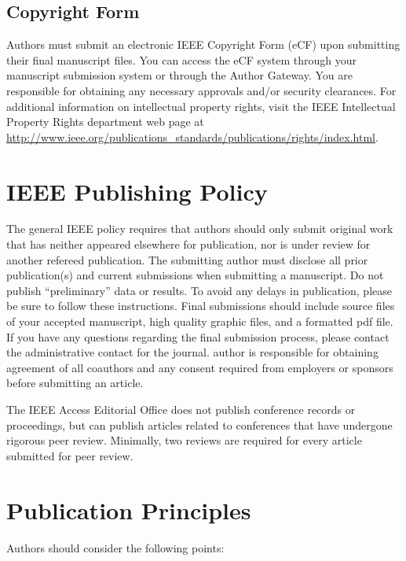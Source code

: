 \documentclass{ieeeaccess}
\begin{document}
\subsection{Copyright Form}
Authors must submit an electronic IEEE Copyright Form (eCF) upon submitting
their final manuscript files. You can access the eCF system through your
manuscript submission system or through the Author Gateway. You are
responsible for obtaining any necessary approvals and/or security
clearances. For additional information on intellectual property rights,
visit the IEEE Intellectual Property Rights department web page at
\underline{http://www.ieee.org/publications\_standards/publications/}\break\underline{rights/index.html}.

\section{\break IEEE Publishing Policy}
The general IEEE policy requires that authors should only submit original
work that has neither appeared elsewhere for publication, nor is under
review for another refereed publication. The submitting author must disclose
all prior publication(s) and current submissions when submitting a
manuscript. Do not publish ``preliminary'' data or results. To avoid any delays in
publication, please be sure to follow these instructions.  Final
submissions should include source files of your accepted manuscript, high
quality graphic files, and a formatted pdf file. If you have any questions
regarding the final submission process, please contact the administrative
contact for the journal.
author is responsible for obtaining agreement of all coauthors and any
consent required from employers or sponsors before submitting an article.

The IEEE Access Editorial Office does not publish conference
records or proceedings, but can publish articles related to conferences that
have undergone rigorous peer review. Minimally, two reviews are required for
every article submitted for peer review.

\section{\break Publication Principles}
Authors should consider the following points:
\end{document}
